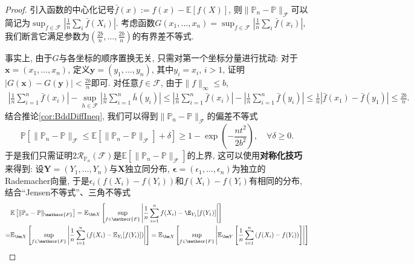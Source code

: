 \begin{proof}
	引入函数的中心化记号$\bar f(x) := f(x) - \mathbb{E}[f(X)]$, 则$\|\mathbb{P}_n - \mathbb{P}\|_{\mathscr{F}}$可以简记为$\sup_{f \in \mathscr{F}} |\frac{1}{n} \sum_i \bar f(X_i)|$. 
	考虑函数$G(x_1, \dots, x_n) = \sup_{f \in \mathscr{F}} |\frac{1}{n} \sum_i \bar f(x_i)|$, 我们断言它满足参数为$(\frac{2b}{n}, \dots, \frac{2b}{n})$的有界差不等式. 
	
	事实上, 由于$G$与各坐标的顺序置换无关, 只需对第一个坐标分量进行扰动: 对于$\bm x = (x_1, \dots, x_n)$, 定义$\bm y = (y_1, \dots, y_n)$, 其中$y_i = x_i$, $i > 1$, 证明$|G(\bm x) - G(\bm y)| < \frac{2b}{n}$即可.  
	对任意$f \in \mathscr{F}$, 由于$\|f\|_{\infty} \leq b$, 
	\begin{align*}
		\left|\frac{1}{n} \sum_{i=1}^n \bar f(x_i)\right| - \sup_{h \in \mathscr{F}} \left|\frac{1}{n} \sum_{i=1}^n \bar h(y_i)\right|
		\leq \left|\frac{1}{n} \sum_{i=1}^n \bar f(x_i)\right| - \left|\frac{1}{n} \sum_{i=1}^n \bar f(y_i)\right|
		\leq \frac{1}{n} |\bar f(x_1) - \bar f(y_1)| 
		\leq \frac{2b}{n}. 
	\end{align*}
	结合推论\ref{cor:BddDiffIneq}, 我们可以得到$\|\mathbb{P}_n - \mathbb{P}\|_{\mathscr{F}}$的偏差不等式
	\begin{equation*}
		\mathbb{P} \left[ \|\mathbb{P}_n - \mathbb{P}\|_{\mathscr{F}} \leq \mathbb{E} \left[ \|\mathbb{P}_n - \mathbb{P}\|_{\mathscr{F}} \right] + \delta \right] 
		\geq 1 - \exp\left( - \frac{n t^2}{2 b^2} \right), \quad \forall \delta \geq 0. 
	\end{equation*}
	于是我们只需证明$2 \mathcal{R}_{\mathbb{P}_n}(\mathscr{F})$是$\mathbb{E} \left[ \|\mathbb{P}_n - \mathbb{P}\|_{\mathscr{F}} \right]$的上界, 这可以使用\textbf{对称化技巧}来得到: 
	设$\bm Y = (Y_1, \dots, Y_n)$与$\bm X$独立同分布, $\bm \epsilon = (\epsilon_1, \dots, \epsilon_n)$为独立的Rademacher向量, 于是$\epsilon_i (f(X_i) - f(Y_i))$和$f(X_i) - f(Y_i)$有相同的分布, 结合“Jensen不等式”、三角不等式
	\begin{align*}
		& \mathbb{E} \left[ \|\mathbb{P}_n - \mathbb{P}\|_{\mathscr{F}} \right]
		= \mathbb{E}_{\bm X} \left[ \sup_{f \in \mathscr{F}} \left| \frac{1}{n} \sum_{i = 1}^n f(X_i) - \E_{Y_1} [f(Y_1)] \right| \right]\\
		= & \mathbb{E}_{\bm X} \left[ \sup_{f \in \mathscr{F}} \left| \frac{1}{n} \sum_{i=1}^n \left( f(X_i) - \mathbb{E}_{Y_i} [f(Y_i)] \right) \right| \right] 
		= \mathbb{E}_{\bm X} \left[ \sup_{f \in \mathscr{F}} \left| \mathbb{E}_{\bm Y} \left[ \frac{1}{n} \sum_{i=1}^n \left( f(X_i) - f(Y_i) \right) \right] \right| \right] \\

\end{align*}
\end{proof}

